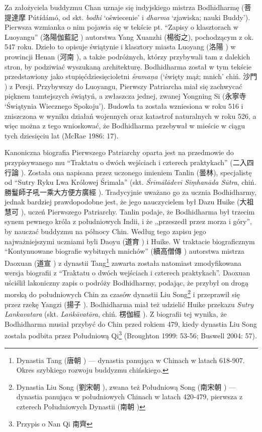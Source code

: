 Za założyciela buddyzmu Chan uznaje się indyjskiego mistrza Bodhidharmę (菩提達摩 Pútídámó, od skt. \textit{bodhi} `oświecenie' i \textit{dharma} `zjawiska; nauki Buddy').
Pierwsza wzmianka o nim pojawia się w tekście pt. ``Zapisy o klasztorach w Luoyangu'' (洛陽伽藍記 ) autorstwa Yang Xuanzhi (楊衒之), pochodzącym z ok. 547 roku.
Dzieło to opisuje świątynie i klasztory miasta Luoyang (洛陽 ) w prowincji Henan (河南 ), a także podróżnych, którzy przybywali tam z dalekich stron, by podziwiać wyszukaną architekturę.
Bodhidharma został w tym tekście przedstawiony jako stupięćdziesięcioletni \textit{śrama\d{n}a} (`święty mąż; mnich' chiń. 沙門 ) z Persji.
Przybywszy do Luoyangu, Pierwszy Patriarcha miał się zachwycać pięknem tamtejszych świątyń, a zwłaszcza jednej, zwanej Yongning Si (永寧寺  `Świątynia Wiecznego Spokoju').
Budowla ta została wzniesiona w roku 516 i zniszczona w wyniku działań wojennych oraz katastrof naturalnych w roku 526, a więc można z tego wnioskować, że Bodhidharma przebywał w mieście w ciągu tych dziesięciu lat
(McRae 1986: 17).

Kanoniczna biografia Pierwszego Patriarchy oparta jest na przedmowie do przypisywanego mu ``Traktatu o dwóch wejściach i czterech praktykach'' (二入四行論 ).
Została ona napisana przez uczonego imieniem Tanlin (曇林), specjalistę od ``Sutry Ryku Lwa Królowej Śrimala'' (skt. \textit{Śrīmālādevī Si\d{m}hanāda Sūtra}, chiń. 勝鬘師子吼一乘大方便方廣經 ).
Tradycyjnie uważano go za ucznia Bodhidharmy, jednak bardziej prawdopodobne jest, że jego nauczycielem był Dazu Huike (大祖慧可 ), uczeń Pierwszego Patriarchy.
Tanlin podaje, że Bodhidharma był trzecim synem pewnego króla z południowych Indii, i że ,,przeszedł przez morza i góry'', by nauczać buddyzmu na północy Chin.
Według tego zapisu jego najważniejszymi uczniami byli Daoyu (道育 ) i Huike.
W traktacie biograficznym ``Kontynuowane biografie wybitnych mnichów'' (續高僧傳 ) autorstwa mistrza Daoxuan (道宣 ) z dynastii Tang\footnote{Dynastia Tang (唐朝 ) --- dynastia panująca w Chinach w latach 618-907. Okres szybkiego rozwoju buddyzmu chińskiego.} zawarta została natomiast zmodyfikowana wersja biografii z ``Traktatu o dwóch wejściach i czterech praktykach''.
Daoxuan uściślił lakoniczny zapis o podróży Bodhidharmy, podając, że przybył on drogą morską do południowych Chin za czasów dynastii Liu Song\footnote{Dynastia Liu Song (劉宋朝 ), zwana też Południową Song (南宋朝 ) --- dynastia panująca w południowych Chinach w latach 420-479, pierwsza z czterech Południowych Dynastii (南朝 )} i przeprawił się przez rzekę Yangzi (揚子 ).
Bodhidharma miał też udzielić Huike przekazu \textit{Sutry Lankavatara} (skt. \textit{La\.nkāvatāra}, chiń. 楞伽經 ).
Z biografii tej wynika, że Bodhidharma musiał przybyć do Chin przed rokiem 479, kiedy dynastia Liu Song została podbita przez Południową Qi\footnote{Przypis o Nan Qi 南齊}
(Broughton 1999: 53-56; Buswell 2004: 57).

